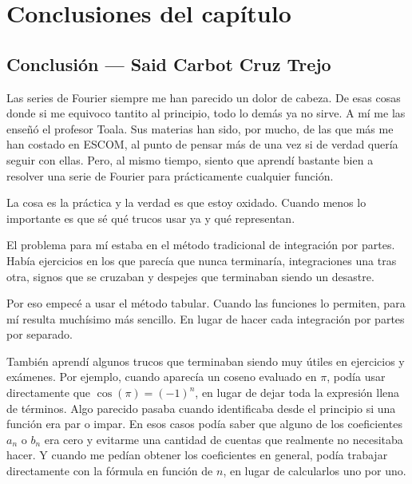 \section{Conclusiones del capítulo}
\label{sec:cap01:conclusiones}


\subsection{Conclusión — Said Carbot Cruz Trejo}
\label{sec:cap01:conclusiones:said}

Las series de Fourier siempre me han parecido un dolor de cabeza. De esas cosas donde si me equivoco tantito al principio, todo lo demás ya no sirve. A mí me las enseñó el profesor Toala. Sus materias han sido, por mucho, de las que más me han costado en ESCOM, al punto de pensar más de una vez si de verdad quería seguir con ellas. Pero, al mismo tiempo, siento que aprendí bastante bien a resolver una serie de Fourier para prácticamente cualquier función.

La cosa es la práctica y la verdad es que estoy oxidado. Cuando menos lo importante es que sé qué trucos usar ya y qué representan.

El problema para mí estaba en el método tradicional de integración por partes. Había ejercicios en los que parecía que nunca terminaría, integraciones una tras otra, signos que se cruzaban y despejes que terminaban siendo un desastre.

Por eso empecé a usar el método tabular. Cuando las funciones lo permiten, para mí resulta muchísimo más sencillo. En lugar de hacer cada integración por partes por separado.

También aprendí algunos trucos que terminaban siendo muy útiles en ejercicios y exámenes. Por ejemplo, cuando aparecía un coseno evaluado en $\pi$, podía usar directamente que $\cos(\pi) = (-1)^n$, en lugar de dejar toda la expresión llena de términos. Algo parecido pasaba cuando identificaba desde el principio si una función era par o impar. En esos casos podía saber que alguno de los coeficientes $a_n$ o $b_n$ era cero y evitarme una cantidad de cuentas que realmente no necesitaba hacer. Y cuando me pedían obtener los coeficientes en general, podía trabajar directamente con la fórmula en función de $n$, en lugar de calcularlos uno por uno.


